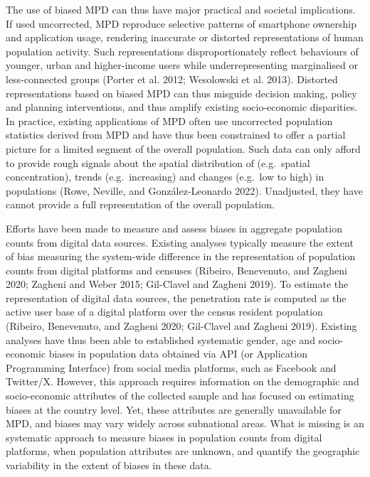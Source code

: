 \documentclass{article}
\begin{document}
The use of biased MPD can thus have major practical and societal
implications. If used uncorrected, MPD reproduce selective patterns of
smartphone ownership and application usage, rendering inaccurate or
distorted representations of human population activity. Such
representations disproportionately reflect behaviours of younger, urban
and higher-income users while underrepresenting marginalised or
less-connected groups (Porter et al. 2012; Wesolowski et al. 2013). Distorted
representations based on biased MPD can thus misguide decision making,
policy and planning interventions, and thus amplify existing
socio-economic disparities. In practice, existing applications of MPD
often use uncorrected population statistics derived from MPD and have
thus been constrained to offer a partial picture for a limited segment
of the overall population. Such data can only afford to provide rough
signals about the spatial distribution of (e.g.~spatial concentration),
trends (e.g.~increasing) and changes (e.g.~low to high) in populations
(Rowe, Neville, and González-Leonardo 2022). Unadjusted, they have cannot provide a full
representation of the overall population.

Efforts have been made to measure and assess biases in aggregate
population counts from digital data sources. Existing analyses typically
measure the extent of bias measuring the system-wide difference in the
representation of population counts from digital platforms and censuses
(Ribeiro, Benevenuto, and Zagheni 2020; Zagheni and Weber 2015; Gil-Clavel and Zagheni 2019). To estimate the
representation of digital data sources, the penetration rate is computed
as the active user base of a digital platform over the census resident
population (Ribeiro, Benevenuto, and Zagheni 2020; Gil-Clavel and Zagheni 2019). Existing analyses
have thus been able to established systematic gender, age and
socio-economic biases in population data obtained via API (or
Application Programming Interface) from social media platforms, such as
Facebook and Twitter/X. However, this approach requires information on
the demographic and socio-economic attributes of the collected sample
and has focused on estimating biases at the country level. Yet, these
attributes are generally unavailable for MPD, and biases may vary widely
across subnational areas. What is missing is an systematic approach to
measure biases in population counts from digital platforms, when
population attributes are unknown, and quantify the geographic
variability in the extent of biases in these data.
\end{document}
